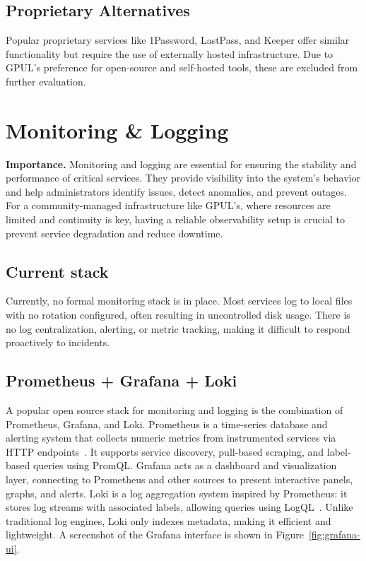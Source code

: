 \subsection{Proprietary Alternatives}
Popular proprietary services like 1Password, LastPass, and Keeper offer similar functionality but require the use of externally hosted infrastructure. Due to GPUL's preference for open-source and self-hosted tools, these are excluded from further evaluation.

\section{Monitoring \& Logging}

\textbf{Importance.} Monitoring and logging are essential for ensuring the stability and performance of critical services. They provide visibility into the system's behavior and help administrators identify issues, detect anomalies, and prevent outages. For a community-managed infrastructure like GPUL's, where resources are limited and continuity is key, having a reliable observability setup is crucial to prevent service degradation and reduce downtime.

\subsection{Current stack}
Currently, no formal monitoring stack is in place. Most services log to local files with no rotation configured, often resulting in uncontrolled disk usage. There is no log centralization, alerting, or metric tracking, making it difficult to respond proactively to incidents.

\subsection{Prometheus + Grafana + Loki}
A popular open source stack for monitoring and logging is the combination of Prometheus, Grafana, and Loki. Prometheus is a time-series database and alerting system that collects numeric metrics from instrumented services via HTTP endpoints~\cite{prometheus_docs}. It supports service discovery, pull-based scraping, and label-based queries using PromQL. Grafana acts as a dashboard and visualization layer, connecting to Prometheus and other sources to present interactive panels, graphs, and alerts. Loki is a log aggregation system inspired by Prometheus: it stores log streams with associated labels, allowing queries using LogQL~\cite{loki_docs}. Unlike traditional log engines, Loki only indexes metadata, making it efficient and lightweight. A screenshot of the Grafana interface is shown in Figure~\ref{fig:grafana-ui}.

